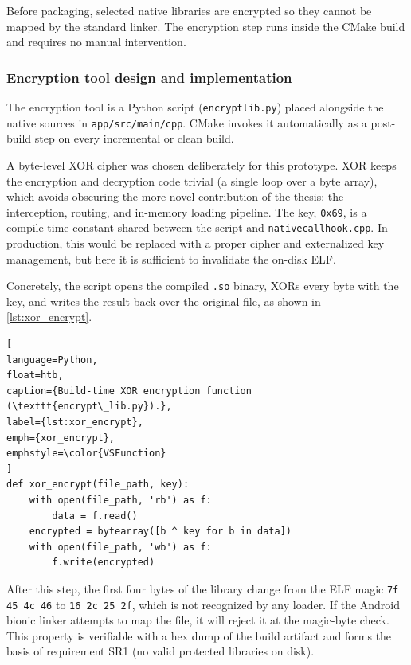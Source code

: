 \documentclass[11pt,a4paper]{report}
\renewcommand\_{{\textunderscore\allowbreak}}
\begin{document}
Before packaging, selected native libraries are encrypted so they cannot be mapped by the standard linker.  The encryption step runs inside the CMake build and requires no manual intervention.

\subsubsection{Encryption tool design and implementation}

The encryption tool is a Python script (\texttt{encrypt\_lib.py}) placed alongside the native sources in \linebreak \texttt{app/src/main/cpp}. CMake invokes it automatically as a post-build step on every incremental or clean build.

A byte-level XOR cipher was chosen deliberately for this prototype. XOR keeps the encryption and decryption code trivial (a single loop over a byte array), which avoids obscuring the more novel contribution of the thesis: the interception, routing, and in-memory loading pipeline. The key, \texttt{0x69}, is a compile-time constant shared between the script and \texttt{nativecallhook.cpp}. In production, this would be replaced with a proper cipher and externalized key management, but here it is sufficient to invalidate the on-disk ELF.

Concretely, the script opens the compiled \texttt{.so} binary, XORs every byte with the key, and writes the result back over the original file, as shown in \cref{lst:xor_encrypt}.

\begin{lstlisting}[
language=Python,
float=htb,
caption={Build-time XOR encryption function (\texttt{encrypt\_lib.py}).},
label={lst:xor_encrypt},
emph={xor_encrypt},
emphstyle=\color{VSFunction}
]
def xor_encrypt(file_path, key):
    with open(file_path, 'rb') as f:
        data = f.read()
    encrypted = bytearray([b ^ key for b in data])
    with open(file_path, 'wb') as f:
        f.write(encrypted)
\end{lstlisting}

After this step, the first four bytes of the library change from the ELF magic \texttt{7f 45 4c 46} to \texttt{16 2c 25 2f}, which is not recognized by any loader. If the Android bionic linker attempts to map the file, it will reject it at the magic-byte check. This property is verifiable with a hex dump of the build artifact and forms the basis of requirement SR1 (no valid protected libraries on disk).
\end{document}
